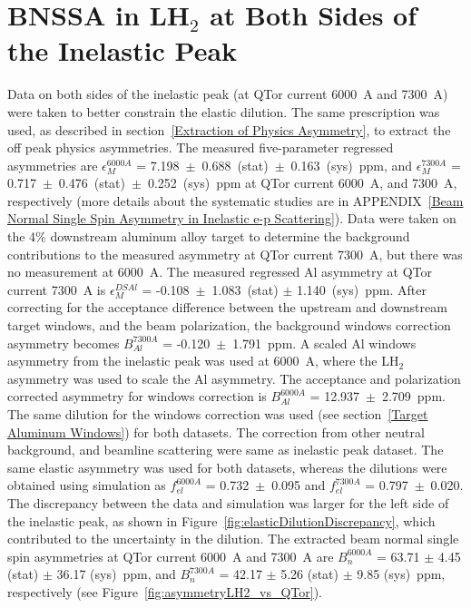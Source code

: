 \section{BNSSA in LH$_{2}$ at Both Sides of the Inelastic Peak}
\label{BNSSA in LH$_{2}$ at Both Sides of the Inelastic Peak}

Data on both sides of the inelastic peak (at QTor current 6000~A and 7300~A) were taken to better constrain the elastic dilution. The same prescription was used, as described in section~\ref{Extraction of Physics Asymmetry}, to extract the off peak physics asymmetries. 
The measured five-parameter regressed asymmetries are $\epsilon_{M}^{6000A}$ = 7.198~$\pm$~0.688~(stat)~$\pm$~0.163~(sys)~ppm, and $\epsilon_{M}^{7300A}$ = 0.717~$\pm$~0.476~(stat)~$\pm$~0.252~(sys)~ppm at QTor current 6000~A, and 7300~A, respectively (more details about the systematic studies are in APPENDIX~\ref{Beam Normal Single Spin Asymmetry in Inelastic e-p Scattering}). 
Data were taken on the 4\% downstream aluminum alloy target to determine the background contributions to the measured asymmetry at QTor current 7300~A, but there was no measurement at 6000~A.
The measured regressed Al asymmetry at QTor current 7300~A is $\epsilon^{DSAl}_{M}$ = -0.108~$\pm$~1.083~(stat) $\pm$ 1.140~(sys)~ppm. After correcting for the acceptance difference between the upstream and downstream target windows, and the beam polarization, the background windows correction asymmetry becomes $B^{7300A}_{Al}$ = -0.120~$\pm$~1.791~ppm. A scaled Al windows asymmetry from the inelastic peak was used at 6000~A, where the LH$_{2}$ asymmetry was used to scale the Al asymmetry. The acceptance and polarization corrected asymmetry for windows correction is $B^{6000A}_{Al}$ = 12.937~$\pm$~2.709~ppm. The same dilution for the windows correction was used (see section~\ref{Target Aluminum Windows}) for both datasets. The correction from other neutral background, and beamline scattering were same as inelastic peak dataset. The same elastic asymmetry was used for both datasets, whereas the dilutions were obtained using simulation as $f_{el}^{6000A}$ = 0.732~$\pm$~0.095 and $f_{el}^{7300A}$ = 0.797~$\pm$~0.020. The discrepancy between the data and simulation was larger for the left side of the inelastic peak, as shown in Figure~\ref{fig:elasticDilutionDiscrepancy}, which contributed to the uncertainty in the dilution. The extracted beam normal single spin asymmetries at QTor current 6000~A and 7300~A are $B_{n}^{6000A}$ = 63.71 $\pm$ 4.45 (stat) $\pm$ 36.17 (sys)~ppm, and $B_{n}^{7300A}$ = 42.17 $\pm$ 5.26 (stat) $\pm$ 9.85 (sys)~ppm, respectively (see Figure~\ref{fig:asymmetryLH2_vs_QTor}).

